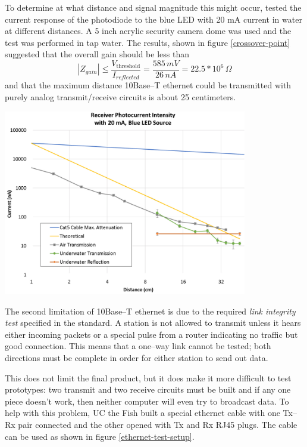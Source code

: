 \documentclass{article}
\begin{document}
To determine at what distance and signal magnitude this might occur,
tested the current response of the photodiode to the blue LED with 20 mA current
in water at different distances.
A 5 inch acrylic security camera dome was used and the test was performed in
tap water.
The results, shown in figure \ref{crossover-point} suggested that the overall gain
should be less than
\begin{equation}
|Z_{gain}| \leq \frac{V_{\textrm{threshold}}}{I_{reflected}}=\frac{585\,mV}{26\,nA}=22.5*10^{6}\,\Omega
\end{equation}
and that the maximum distance 10Base--T ethernet could be transmitted with purely analog transmit/receive
circuits is about 25 centimeters.

\begin{center}
	\includegraphics[width=0.8\textwidth]{crossover-point.pdf}
	\label{crossover-point}
\end{center}

The second limitation of 10Base--T ethernet is due to the required \textit{link integrity test}
specified in the standard.
A station is not allowed to transmit unless it hears either incoming packets or
a special pulse from a router indicating no traffic but good connection.
This means that a one--way link cannot be tested; both directions must be complete
in order for either station to send out data.

This does not limit the final product, but it does make it more difficult to test
prototypes: two transmit and two receive circuits must be built and if
any one piece doesn't work, then neither computer will even try to broadcast data.
To help with this problem, UC the Fish built a special ethernet cable with
one Tx--Rx pair connected and the other opened with Tx and Rx RJ45 plugs.
The cable can be used as shown in figure \ref{ethernet-test-setup}.
\end{document}
